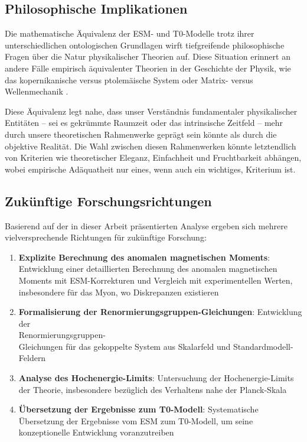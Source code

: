 \documentclass[12pt,a4paper]{article}
\begin{document}
	\subsection{Philosophische Implikationen}
	\label{subsec:philosophical}
	
	Die mathematische Äquivalenz der ESM- und T0-Modelle trotz ihrer unterschiedlichen ontologischen Grundlagen wirft tiefgreifende philosophische Fragen über die Natur physikalischer Theorien auf. Diese Situation erinnert an andere Fälle empirisch äquivalenter Theorien in der Geschichte der Physik, wie das kopernikanische versus ptolemäische System oder Matrix- versus Wellenmechanik \cite{kuhn1962}.
	
	Diese Äquivalenz legt nahe, dass unser Verständnis fundamentaler physikalischer Entitäten – sei es gekrümmte Raumzeit oder das intrinsische Zeitfeld – mehr durch unsere theoretischen Rahmenwerke geprägt sein könnte als durch die objektive Realität. Die Wahl zwischen diesen Rahmenwerken könnte letztendlich von Kriterien wie theoretischer Eleganz, Einfachheit und Fruchtbarkeit abhängen, wobei empirische Adäquatheit nur eines, wenn auch ein wichtiges, Kriterium ist.
	
	\subsection{Zukünftige Forschungsrichtungen}
	\label{subsec:future_research}
	
	Basierend auf der in dieser Arbeit präsentierten Analyse ergeben sich mehrere vielversprechende Richtungen für zukünftige Forschung:
	
	\begin{enumerate}
		\item \textbf{Explizite Berechnung des anomalen magnetischen Moments}: Entwicklung einer detaillierten Berechnung des anomalen magnetischen Moments mit ESM-Korrekturen und Vergleich mit experimentellen Werten, insbesondere für das Myon, wo Diskrepanzen existieren
		\item \textbf{Formalisierung der Renormierungsgruppen-Gleichungen}: Entwicklung der \\
		 Renormierungsgruppen-\\
		 Gleichungen für das gekoppelte System aus Skalarfeld und Standardmodell-Feldern
		\item \textbf{Analyse des Hochenergie-Limits}: Untersuchung der Hochenergie-Limits der Theorie, insbesondere bezüglich des Verhaltens nahe der Planck-Skala
		\item \textbf{Übersetzung der Ergebnisse zum T0-Modell}: Systematische Übersetzung der Ergebnisse vom ESM zum T0-Modell, um seine konzeptionelle Entwicklung voranzutreiben
	\end{enumerate}
	
\end{document}

